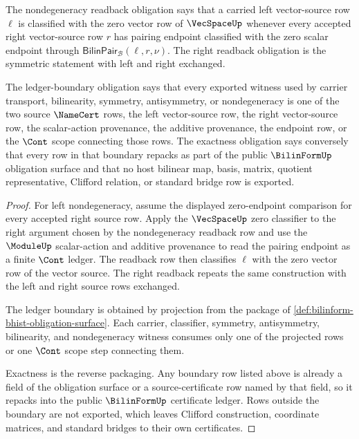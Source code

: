 \begin{theorem}
\label{thm:bilinform-nondegeneracy-ledger-exactness-obligations}
The nondegeneracy readback obligation says that a carried left vector-source row $\ell$ is classified with the zero vector row of $\VecSpaceUp$ whenever every accepted right vector-source row $r$ has pairing endpoint classified with the zero scalar endpoint through $\mathsf{BilinPair}_{\mathcal{B}}(\ell,r,\nu)$. The right readback obligation is the symmetric statement with left and right exchanged.

The ledger-boundary obligation says that every exported witness used by carrier transport, bilinearity, symmetry, antisymmetry, or nondegeneracy is one of the two source $\NameCert$ rows, the left vector-source row, the right vector-source row, the scalar-action provenance, the additive provenance, the endpoint row, or the $\Cont$ scope connecting those rows. The exactness obligation says conversely that every row in that boundary repacks as part of the public $\BilinFormUp$ obligation surface and that no host bilinear map, basis, matrix, quotient representative, Clifford relation, or standard bridge row is exported.
\end{theorem}
\begin{proof}
For left nondegeneracy, assume the displayed zero-endpoint comparison for every accepted right source row. Apply the $\VecSpaceUp$ zero classifier to the right argument chosen by the nondegeneracy readback row and use the $\ModuleUp$ scalar-action and additive provenance to read the pairing endpoint as a finite $\Cont$ ledger. The readback row then classifies $\ell$ with the zero vector row of the vector source. The right readback repeats the same construction with the left and right source rows exchanged.

The ledger boundary is obtained by projection from the package of \autoref{def:bilinform-bhist-obligation-surface}. Each carrier, classifier, symmetry, antisymmetry, bilinearity, and nondegeneracy witness consumes only one of the projected rows or one $\Cont$ scope step connecting them.

Exactness is the reverse packaging. Any boundary row listed above is already a field of the obligation surface or a source-certificate row named by that field, so it repacks into the public $\BilinFormUp$ certificate ledger. Rows outside the boundary are not exported, which leaves Clifford construction, coordinate matrices, and standard bridges to their own certificates.
\end{proof}

